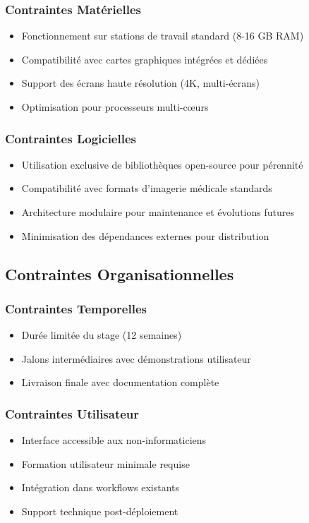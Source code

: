 \documentclass[12pt,a4paper]{report}
\begin{document}
\subsubsection{Contraintes Matérielles}
\begin{itemize}
\item Fonctionnement sur stations de travail standard (8-16 GB RAM)
\item Compatibilité avec cartes graphiques intégrées et dédiées
\item Support des écrans haute résolution (4K, multi-écrans)
\item Optimisation pour processeurs multi-cœurs
\end{itemize}

\subsubsection{Contraintes Logicielles}
\begin{itemize}
\item Utilisation exclusive de bibliothèques open-source pour pérennité
\item Compatibilité avec formats d'imagerie médicale standards
\item Architecture modulaire pour maintenance et évolutions futures
\item Minimisation des dépendances externes pour distribution
\end{itemize}

\subsection{Contraintes Organisationnelles}

\subsubsection{Contraintes Temporelles}
\begin{itemize}
\item Durée limitée du stage (12 semaines)
\item Jalons intermédiaires avec démonstrations utilisateur
\item Livraison finale avec documentation complète
\end{itemize}

\subsubsection{Contraintes Utilisateur}
\begin{itemize}
\item Interface accessible aux non-informaticiens
\item Formation utilisateur minimale requise
\item Intégration dans workflows existants
\item Support technique post-déploiement
\end{itemize}
\end{document}

